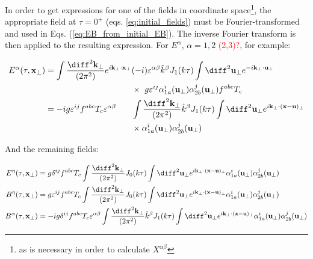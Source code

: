 In order to get expressions for one of the fields in coordinate  space\textcolor{red}{\footnote{as is necessary in order to calculate $X^{\alpha \beta}$}}, the appropriate field at $\tau=0^+$ (eqs. \ref{eq:initial_fields}) must be Fourier-transformed and used in Eqs. (\ref{eq:EB_from_initial_EB}). The inverse Fourier transform is then applied to the resulting expression. For $E^\alpha$, $\alpha=1,2$ \textcolor{red}{(2,3)?}, for example:

\begin{equation}
\begin{alignedat}{2}
	E^\alpha (\tau,\mathbf{x}_\perp) & =  \int \frac{\diff^2 \mathbf{k}_\perp}{(2\pi^2)} e^{i \mathbf{k}_\perp \cdot \mathbf{x}_\perp} & & (-i)   \varepsilon^{\alpha \beta} \hat{k}^\beta J_1 (k \tau)  \int \diff^2 \mathbf{u}_\perp e^{-i \mathbf{k}_\perp \cdot \mathbf{u}_\perp} \\
	& ~ & & \times ~ g \varepsilon^{ij} \alpha^i_{1a} (\mathbf{u}_\perp) \alpha^j_{2b}(\mathbf{u}_\perp) f^{abc} T_c \\
	& = -ig \varepsilon^{ij} f^{abc} T_c \varepsilon^{\alpha \beta} & & \int  \frac{\diff^2 \mathbf{k}_\perp}{(2\pi^2)} \hat{k}^\beta J_1 (k \tau) \int \diff^2 \mathbf{u}_\perp e^{i \mathbf{k}_\perp \cdot (\mathbf{x} - \mathbf{u})_\perp}  \\
	& ~ & & \times \alpha^i_{1a} (\mathbf{u}_\perp) \alpha^j_{2b}(\mathbf{u}_\perp) 
\end{alignedat}
\end{equation}

And the remaining fields:

\begin{align}
	E^\eta (\tau,\mathbf{x}_\perp) & = g \delta^{ij} f^{abc} T_c \int  \frac{\diff^2 \mathbf{k}_\perp}{(2\pi^2)} J_0 (k \tau) \int \diff^2 \mathbf{u}_\perp e^{i \mathbf{k}_\perp \cdot (\mathbf{x} - \mathbf{u})_\perp} \alpha^i_{1a} (\mathbf{u}_\perp) \alpha^j_{2b}(\mathbf{u}_\perp) \\
	B^\eta (\tau,\mathbf{x}_\perp) & = g \varepsilon^{ij} f^{abc} T_c \int  \frac{\diff^2 \mathbf{k}_\perp}{(2\pi^2)} J_0 (k \tau) \int \diff^2 \mathbf{u}_\perp e^{i \mathbf{k}_\perp \cdot (\mathbf{x} - \mathbf{u})_\perp} \alpha^i_{1a} (\mathbf{u}_\perp) \alpha^j_{2b}(\mathbf{u}_\perp) \\
	B^\alpha (\tau,\mathbf{x}_\perp) & = -ig \delta^{ij} f^{abc} T_c \varepsilon^{\alpha \beta} \int  \frac{\diff^2 \mathbf{k}_\perp}{(2\pi^2)} \hat{k}^\beta J_1 (k \tau) \int \diff^2 \mathbf{u}_\perp e^{i \mathbf{k}_\perp \cdot (\mathbf{x} - \mathbf{u})_\perp} \alpha^i_{1a} (\mathbf{u}_\perp) \alpha^j_{2b}(\mathbf{u}_\perp) 
\end{align}
